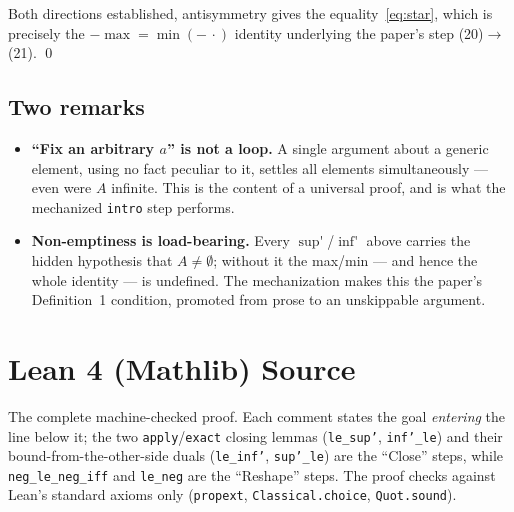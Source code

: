 \documentclass[11pt]{article}
\newcommand{\code}[1]{\texttt{#1}}
\DeclareMathOperator*{\supp}{sup'}
\DeclareMathOperator*{\infp}{inf'}
\begin{document}
Both directions established, antisymmetry gives the equality~\eqref{eq:star},
which is precisely the $-\max = \min(-\,\cdot)$ identity underlying the paper's
step (20)$\to$(21). \qed

\subsection*{Two remarks}

\begin{itemize}
  \item \textbf{``Fix an arbitrary $a$'' is not a loop.} A single argument about
    a generic element, using no fact peculiar to it, settles all elements
    simultaneously --- even were $A$ infinite. This is the content of a
    universal proof, and is what the mechanized \code{intro} step performs.
  \item \textbf{Non-emptiness is load-bearing.} Every $\supp$/$\infp$ above
    carries the hidden hypothesis that $A \neq \emptyset$; without it the
    max/min --- and hence the whole identity --- is undefined. The mechanization
    makes this the paper's Definition~1 condition, promoted from prose to an
    unskippable argument.
\end{itemize}

\appendix
\section{Lean 4 (Mathlib) Source}
\label{sec:code}

The complete machine-checked proof. Each comment states the goal \emph{entering}
the line below it; the two \code{apply}/\code{exact} closing lemmas
(\code{le\_sup'}, \code{inf'\_le}) and their bound-from-the-other-side duals
(\code{le\_inf'}, \code{sup'\_le}) are the ``Close'' steps, while
\code{neg\_le\_neg\_iff} and \code{le\_neg} are the ``Reshape'' steps. The proof
checks against Lean's standard axioms only (\code{propext},
\code{Classical.choice}, \code{Quot.sound}).
\end{document}
